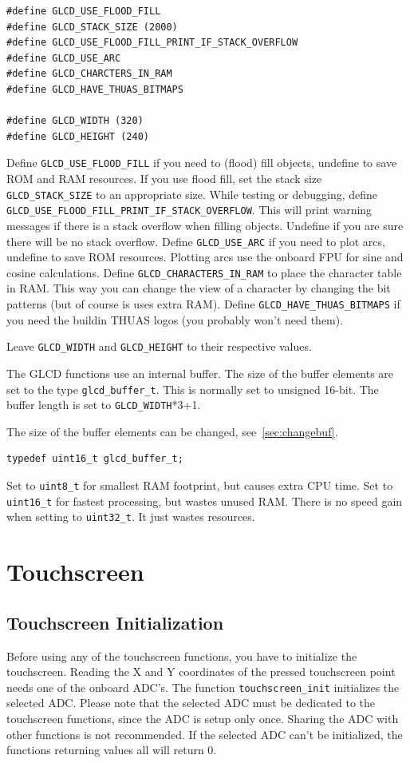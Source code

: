 \documentclass[12pt]{article}
\begin{document}
\begin{lstlisting}
#define GLCD_USE_FLOOD_FILL
#define GLCD_STACK_SIZE (2000)
#define GLCD_USE_FLOOD_FILL_PRINT_IF_STACK_OVERFLOW
#define GLCD_USE_ARC
#define GLCD_CHARCTERS_IN_RAM
#define GLCD_HAVE_THUAS_BITMAPS

#define GLCD_WIDTH (320)
#define GLCD_HEIGHT (240)
\end{lstlisting}

Define \lstinline|GLCD_USE_FLOOD_FILL| if you need to (flood) fill objects, undefine to save ROM  and RAM resources. If you use flood fill, set the stack size \lstinline|GLCD_STACK_SIZE| to an appropriate size. While testing or debugging, define \lstinline|GLCD_USE_FLOOD_FILL_PRINT_IF_STACK_OVERFLOW|. This will print warning messages if there is a stack overflow when filling objects. Undefine if you are sure there will be no stack overflow. Define \lstinline|GLCD_USE_ARC| if you need to plot arcs, undefine to save ROM resources. Plotting arcs use the onboard FPU for sine and cosine calculations. Define \lstinline|GLCD_CHARACTERS_IN_RAM| to place the character table in RAM. This way you can change the view of a character by changing the bit patterns (but of course is uses extra RAM). Define \lstinline|GLCD_HAVE_THUAS_BITMAPS| if you need the buildin THUAS logos (you probably won't need them).

Leave \lstinline|GLCD_WIDTH| and \lstinline|GLCD_HEIGHT| to their respective values.

The GLCD functions use an internal buffer. The size of the buffer elements are set to the type \lstinline|glcd_buffer_t|. This is normally set to unsigned 16-bit. The buffer length is set to \lstinline|GLCD_WIDTH|*3+1.

The size of the buffer elements can be changed, see~\ref{sec:changebuf}.

\begin{lstlisting}
typedef uint16_t glcd_buffer_t;
\end{lstlisting}

Set to \lstinline|uint8_t| for smallest RAM footprint, but causes extra CPU time. Set to \lstinline|uint16_t| for fastest processing, but wastes unused RAM. There is no speed gain when setting to \lstinline|uint32_t|. It just wastes resources.

\section{Touchscreen}
\subsection{Touchscreen Initialization}
Before using any of the touchscreen functions, you have to initialize the touchscreen. Reading the X and Y coordinates of the pressed touchscreen point needs one of the onboard ADC's. The function \lstinline|touchscreen_init| initializes the selected ADC. Please note that the selected ADC must be dedicated to the touchscreen functions, since the ADC is setup only once. Sharing the ADC with other functions is not recommended. If the selected ADC can't be initialized, the functions returning values all will return 0.
\end{document}
